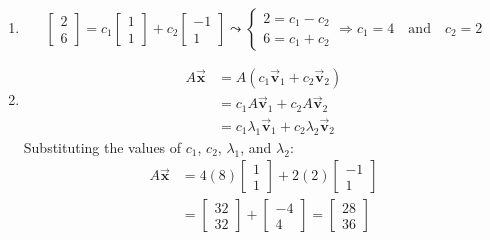 \documentclass[letter,11pt]{article}
\theoremstyle{definition}
\begin{document}
\begin{tcolorbox}[boxrule=1mm,enhanced jigsaw, breakable,before=\hfill,after=\hfill,adjusted title={Problem 5 solutions}]
\begin{enumerate}[label = (\Alph*.)]
\begin{minipage}{0.5\textwidth}
            \end{minipage}
            \item $$\begin{bmatrix}2\\6\end{bmatrix} = c_{1}\begin{bmatrix}1\\1\end{bmatrix} +c_{2}\begin{bmatrix}-1\\1\end{bmatrix} \leadsto \begin{cases}
            2= c_{1}-c_{2}\\
            6=c_{1}+c_{2}
            \end{cases} \Longrightarrow c_{1} =4 \quad \text{and} \quad c_{2} = 2$$
            \item 
                \begin{align*}
                    A\vec{\boldsymbol{x}} &= A(c_1\vec{\boldsymbol{v}}_1 + c_2\vec{\boldsymbol{v}}_2)\\
                    &= c_{1}A\vec{\boldsymbol{v}}_1 + c_{2}A\vec{\boldsymbol{v}}_{2}\\
                    &=c_{1}\lambda_{1}\vec{\boldsymbol{v}}_{1} + c_{2}\lambda_{2}\vec{\boldsymbol{v}}_{2}
                \end{align*}
            Substituting the values of $c_1$, $c_2$, $\lambda_1$, and $\lambda_2$:
                \begin{align*}
                    A\vec{\boldsymbol{x}} &= 4(8)\begin{bmatrix} 1 \\ 1 \end{bmatrix} + 2(2)\begin{bmatrix} -1 \\ 1 \end{bmatrix}\\
                    &= \begin{bmatrix} 32 \\ 32 \end{bmatrix} + \begin{bmatrix} -4 \\ 4 \end{bmatrix} =\begin{bmatrix} 28 \\ 36 \end{bmatrix}
                \end{align*}
    \end{enumerate}
\end{tcolorbox}
\newpage
\end{document}
